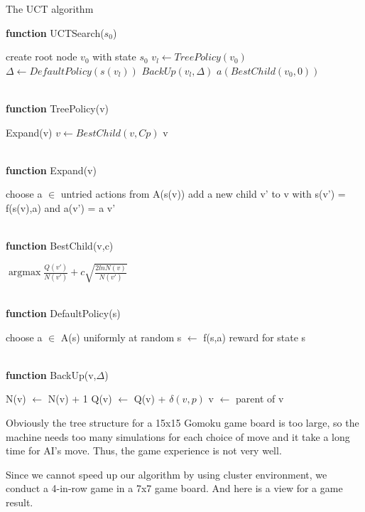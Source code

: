 \documentclass[12pt,a4paper]{article}
\begin{document}
\begin{algorithm}[h]
\caption{The UCT algorithm} 
\hspace*{0.02in} {\bf function} 
UCTSearch($s_0$) 
\begin{algorithmic}
\State create root node $v_0$ with state $s_0$
	\State $v_l \gets TreePolicy(v_0)$ 
	\State $\Delta \gets DefaultPolicy(s(v_l))$ 
	\State $BackUp(v_l, \Delta)$
\EndWhile
\State \Return $a(BestChild(v_0, 0))$
\end{algorithmic}
~\\
\hspace*{0.02in} {\bf function}
TreePolicy(v)
\begin{algorithmic}
		\State \Return Expand(v)
	\Else
		\State $v \gets BestChild(v, Cp)$
	\EndIf
\EndWhile
\State \Return v
\end{algorithmic}
~\\
\hspace*{0.02in} {\bf function}
Expand(v)
\begin{algorithmic}
\State choose a $\in$ untried actions from A(s(v))
\State add a new child v' to v with s(v') = f(s(v),a) and a(v') = a
\State \Return v'
\end{algorithmic}
~\\
\hspace*{0.02in} {\bf function}
BestChild(v,c)
\begin{algorithmic}
\State \Return $\mathop{\arg\max} \frac{Q(v')}{N(v')} + c\sqrt{\frac{2lnN(v)}{N(v')}}$
\end{algorithmic}
~\\
\hspace*{0.02in} {\bf function}
DefaultPolicy(s)
\begin{algorithmic}
	\State choose a $\in$ A(s) uniformly at random
	\State s $\gets$ f(s,a)
\EndWhile
\State \Return reward for state s
\end{algorithmic}
~\\
\hspace*{0.02in} {\bf function}
BackUp(v,$\Delta$)
\begin{algorithmic}
	\State N(v) $\gets$ N(v) + 1
	\State Q(v) $\gets$ Q(v) + $\delta(v, p)$
	\State v $\gets$ parent of v
\EndWhile
\end{algorithmic}
\end{algorithm}
\par Obviously the tree structure for a 15x15 Gomoku game board is too large, so the machine needs too many simulations for each choice of move and it take a long time for AI's move. Thus, the game experience is not very well.
\par Since we cannot speed up our algorithm by using cluster environment, we conduct a 4-in-row game in a 7x7 game board. And here is a view for a game result.
\end{document}
